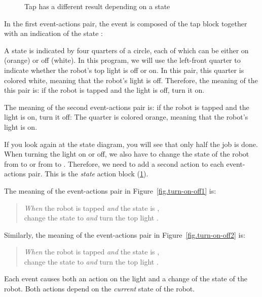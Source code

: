 \begin{figure}
\caption{Tap has a different result depending on a state}
\label{fig.turn-on-off}
\end{figure}

In the first event-actions pair, the event is composed of the tap block
together with an indication of the state :

A state is indicated by four quarters of a circle, each of which can be
either on (orange) or off (white). In this program, we will use the
left-front quarter to indicate whether the robot's top light is off or
on. In this pair, this quarter is colored white, meaning that the
robot's light is off. Therefore, the meaning of the this pair is: if the
robot is tapped and the light is off, turn it on.

The meaning of the second event-actions pair is: if the robot is tapped
and the light is on, turn it off:
The quarter is colored orange, meaning that the robot's light is on.

If you look again at the state diagram, you will see that only half the
job is done. When turning the light on or off, we also have to change
the state of the robot from  to  or from  to
. Therefore, we need to add a second action to each
event-actions pair. This is the \emph{state} action block
 (\cref{fig.turn-on-off}).

The meaning of the event-actions pair in Figure~\ref{fig.turn-on-off1} is:
\begin{quote}
\emph{When} the robot is tapped \emph{and} the state is ,\\
change the state to  \emph{and} turn the top light .
\end{quote}
Similarly, the meaning of the event-actions pair in Figure~\ref{fig.turn-on-off2} is:
\begin{quote}
\emph{When} the robot is tapped \emph{and} the state is ,\\
change the state to  \emph{and} turn the top light .
\end{quote}

Each event causes both an action on the light and a change of the state
of the robot. Both actions depend on the \emph{current} state of the robot.

